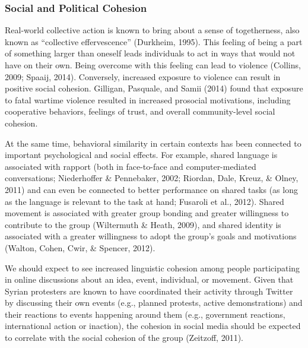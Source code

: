 \documentclass[english,man]{apa6}
\begin{document}
\hypertarget{social-and-political-cohesion}{%
\subsubsection{Social and Political Cohesion}\label{social-and-political-cohesion}}

Real-world collective action is known to bring about a sense of togetherness,
also known as \enquote{collective effervescence} (Durkheim, 1995). This feeling
of being a part of something larger than oneself leads individuals to act in
ways that would not have on their own. Being overcome with this feeling can lead
to violence (Collins, 2009; Spaaij, 2014). Conversely, increased
exposure to violence can result in positive social cohesion. Gilligan, Pasquale, and Samii (2014)
found that exposure to fatal wartime violence resulted in increased prosocial
motivations, including cooperative behaviors, feelings of trust, and overall
community-level social cohesion.

At the same time, behavioral similarity in certain contexts has been
connected to important psychological and social effects. For example, shared
language is associated with rapport (both in face-to-face and computer-mediated
conversations; Niederhoffer \& Pennebaker, 2002; Riordan, Dale, Kreuz, \& Olney, 2011) and
can even be connected to better performance on shared tasks (as long as
the language is relevant to the task at hand; Fusaroli et al., 2012). Shared
movement is associated with greater group bonding and greater willingness
to contribute to the group (Wiltermuth \& Heath, 2009), and shared identity
is associated with a greater willingness to adopt the group's goals and
motivations (Walton, Cohen, Cwir, \& Spencer, 2012).

We should expect to see increased linguistic cohesion among people participating
in online discussions about an idea, event, individual, or movement. Given that
Syrian protesters are known to have coordinated their activity through Twitter
by discussing their own events (e.g., planned protests, active demonstrations)
and their reactions to events happening around them (e.g., government reactions,
international action or inaction), the cohesion in social media should be
expected to correlate with the social cohesion of the group (Zeitzoff, 2011).
\end{document}
